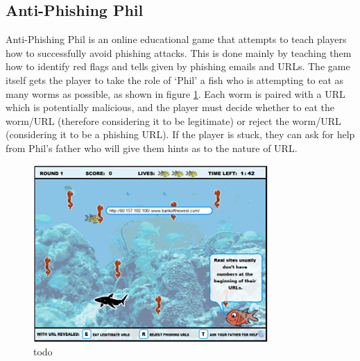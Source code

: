 \documentclass{l4proj}
\begin{document}
\subsection{Anti-Phishing Phil}
Anti-Phishing Phil \citep{sheng2007anti} is an online educational game that attempts to teach players how to successfully avoid phishing attacks. This is done mainly by teaching them how to identify red flags and tells given by phishing emails and URLs. The game itself gets the player to take the role of ‘Phil’ a fish who is attempting to eat as many worms as possible, as shown in figure \ref{fig:antiphishingphil}. Each worm is paired with a URL which is potentially malicious, and the player must decide whether to eat the worm/URL (therefore considering it to be legitimate) or reject the worm/URL (considering it to be a phishing URL). If the player is stuck, they can ask for help from Phil’s father who will give them hints as to the nature of URL. 
\begin{figure}[htp]
    \centering
    \includegraphics[width=0.5\linewidth]{images/antiphishingphil.png}    
    \caption{todo}
    \label{fig:antiphishingphil} 
\end{figure}
\newline
\end{document}
